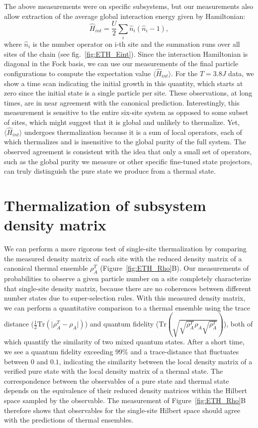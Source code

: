 The above measurements were on specific subsystems, but our measurements also allow extraction of the average global interaction energy given by Hamiltonian:
\begin{equation}
\hat{H}_{int}=\frac{U}{2}\sum_i \hat{n}_i(\hat{n}_i-1),
\end{equation}
where $\hat{n}_i$ is the number operator on i-th site and the summation runs over all sites of the chain (see fig.~\ref{fig:ETH_Eint}). Since the interaction Hamiltonian is diagonal in the Fock basis, we can use our measurements of the final particle configurations to compute the expectation value $\langle \hat{H}_{int} \rangle$. For the $T=3.8J$ data, we show a time scan indicating the initial growth in this quantity, which starts at zero since the initial state is a single particle per site.  These observations, at long times, are in near agreement with the canonical prediction. Interestingly, this measurement is sensitive to the entire six-site system as opposed to some subset of sites, which might suggest that it is global and unlikely to thermalize. Yet, $\langle \hat{H}_{int} \rangle$ undergoes thermalization because it is a sum of local operators, each of which thermalizes and is insensitive to the global purity of the full system.  The observed agreement is consistent with the idea that only a small set of operators, such as the global purity we measure or other specific fine-tuned state projectors, can truly distinguish the pure state we produce from a thermal state.

\section{Thermalization of subsystem density matrix}

We can perform a more rigorous test of single-site thermalization by comparing the measured density matrix of each site with the reduced density matrix of a canonical thermal ensemble $\rho_A^T$ (Figure~\ref{fig:ETH_Rho}B). Our measurements of probabilities to observe a given particle number on a site completely characterize that single-site density matrix, because there are no coherences between different number states due to super-selection rules. With this measured density matrix, we can perform a quantitative comparison to a thermal ensemble using the trace distance ($\frac{1}{2}\mathrm{Tr}(\vert \rho_A^T -  \rho_A \vert)$) and quantum fidelity ($\mathrm{Tr}\left ( \sqrt{\sqrt{\rho_A^T} \rho_A \sqrt{\rho_A^T}}\right )$), both of which quantify the similarity of two mixed quantum states. After a short time, we see a quantum fidelity exceeding $99\%$ and a trace-distance that fluctuates between $0$ and $0.1$, indicating the similarity between the local density matrix of a verified pure state with the local density matrix of a thermal state. The correspondence between the observables of a pure state and thermal state depends on the equivalence of their reduced density matrices within the Hilbert space sampled by the observable. The measurement of Figure~\ref{fig:ETH_Rho}B therefore shows that observables for the single-site Hilbert space should agree with the predictions of thermal ensembles. 

